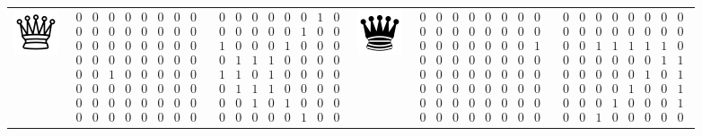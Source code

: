 \begin{table}[]
\begin{tabular}{c c c | c c c}
\includegraphics[scale=0.5]{fig/pieces/Q} & 
$\begin{smallmatrix}0&0&0&0&0&0&0&0\\0&0&0&0&0&0&0&0\\0&0&0&0&0&0&0&0\\0&0&0&0&0&0&0&0\\0&0&1&0&0&0&0&0\\0&0&0&0&0&0&0&0\\0&0&0&0&0&0&0&0\\0&0&0&0&0&0&0&0\end{smallmatrix}$ &
$\begin{smallmatrix}0&0&0&0&0&0&1&0\\0&0&0&0&0&1&0&0\\1&0&0&0&1&0&0&0\\0&1&1&1&0&0&0&0\\1&1&0&1&0&0&0&0\\0&1&1&1&0&0&0&0\\0&0&1&0&1&0&0&0\\0&0&0&0&0&1&0&0\end{smallmatrix}$&

\includegraphics[scale=0.5]{fig/pieces/q} &
$\begin{smallmatrix}0&0&0&0&0&0&0&0\\0&0&0&0&0&0&0&0\\0&0&0&0&0&0&0&1\\0&0&0&0&0&0&0&0\\0&0&0&0&0&0&0&0\\0&0&0&0&0&0&0&0\\0&0&0&0&0&0&0&0\\0&0&0&0&0&0&0&0\end{smallmatrix}$ &
$\begin{smallmatrix}0&0&0&0&0&0&0&0\\0&0&0&0&0&0&0&0\\0&0&1&1&1&1&1&0\\0&0&0&0&0&0&1&1\\0&0&0&0&0&1&0&1\\0&0&0&0&1&0&0&1\\0&0&0&1&0&0&0&1\\0&0&1&0&0&0&0&0\end{smallmatrix}$ \\ [1cm]


\end{tabular}
\end{table}
